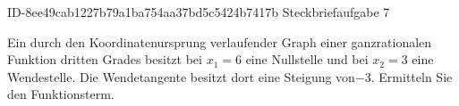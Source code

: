 \begin{exercise}
      {ID-8ee49cab1227b79a1ba754aa37bd5c5424b7417b}
      {Steckbriefaufgabe 7}
  \ifproblem\problem\par
    Ein durch den Koordinatenursprung verlaufender Graph einer ganzrationalen
    Funktion dritten Grades besitzt bei $x_1=\num{6}$ eine Nullstelle und bei
    $x_2=\num{3}$ eine Wendestelle. Die Wendetangente besitzt dort eine
    Steigung von\num{-3}. Ermitteln Sie den Funktionsterm.
  \fi
\end{exercise}
